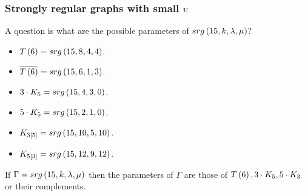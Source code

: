 \pagebreak

\subsubsection{Strongly regular graphs with small $ v $}

A question is what are the possible parameters of $ srg\br{15, k, \lambda, \mu} $?

\begin{example*}
\hfill
\begin{itemize}
\item $ T\br{6} = srg\br{15, 8, 4, 4} $.
\item $ \overline{T\br{6}} = srg\br{15, 6, 1, 3} $.
\item $ 3 \cdot K_5 = srg\br{15, 4, 3, 0} $.
\item $ 5 \cdot K_5 = srg\br{15, 2, 1, 0} $.
\item $ K_{3\sbr{5}} = srg\br{15, 10, 5, 10} $.
\item $ K_{5\sbr{3}} = srg\br{15, 12, 9, 12} $.
\end{itemize}
\end{example*}

\begin{proposition}
If $ \Gamma = srg\br{15, k, \lambda, \mu} $ then the parameters of $ \Gamma $ are those of $ T\br{6}, 3 \cdot K_5, 5 \cdot K_3 $ or their complements.
\end{proposition}

